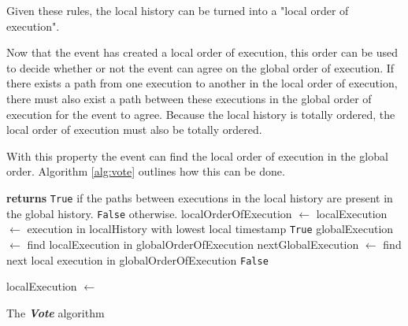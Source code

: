 	
	\newpar	Given these rules, the local history can be turned into a "local order of execution".
	
	\newpar Now that the event has created a local order of execution, this order can be used to decide whether or not the event can agree on the global order of execution. If there exists a path from one execution to another in the local order of execution, there must also exist a path between these executions in the global order of execution for the event to agree. Because the local history is totally ordered, the local order of execution must also be totally ordered.
	
	With this property the event can find the local order of execution in the global order. Algorithm \ref{alg:vote} outlines how this can be done.
	
	\begin{algorithm}
		\begin{algorithmic}
				\State\hspace{2em}\textbf{returns} \texttt{True} if the paths between executions in the local history are present in the
				\State\hspace{6em}global history. \texttt{False} otherwise.
				\State localOrderOfExecution $\leftarrow$ 
				\State localExecution $\leftarrow$ execution in localHistory with lowest local timestamp
						\State \Return \texttt{True}
					\EndIf
					\State globalExecution $\leftarrow$ find localExecution in globalOrderOfExecution
					\State nextGlobalExecution $\leftarrow$ find next local execution in globalOrderOfExecution
						\State\Return \texttt{False}
					\EndIf
					
					\State localExecution $\leftarrow$ 
				\EndWhile
			\EndFunction
		\end{algorithmic}
		\caption{The \textit{\textbf{Vote}} algorithm}
		\label{alg:vote}
	\end{algorithm}
	
